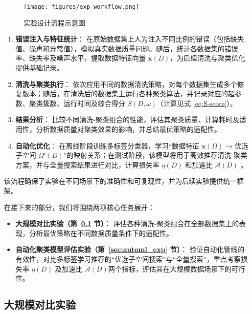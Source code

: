 \documentclass[10pt]{article} %
\numberwithin{equation}{section}
\begin{document}
\begin{figure}[htbp]
    \centering
    \texttt{[image: figures/exp\_workflow.png]}
    \caption{实验设计流程示意图}
    \label{fig:exp_workflow}
\end{figure}

\begin{enumerate}
    \item \textbf{错误注入与特征统计}：  
    在原始数据集上人为注入不同比例的错误（包括缺失值、噪声和异常值），模拟真实数据质量问题。随后，统计各数据集的错误率、缺失率及噪声水平，提取数据特征向量 \(\mathbf{x}(D)\)，为后续清洗与聚类优化提供基础记录。

    \item \textbf{清洗与聚类执行}：  
    依次应用不同的数据清洗策略，对每个数据集生成多个修复版本；随后，在清洗后的数据集上运行各种聚类算法，并记录对应的超参数、聚类簇数、运行时间及综合得分 \(S(D,\omega)\)（计算见式 \eqref{eq:S-score}）。

    \item \textbf{结果分析}：  
    比较不同清洗-聚类组合的性能，评估其聚类质量、计算耗时及适用性，分析数据质量对聚类效果的影响，并总结最优策略的适配性。

    \item \textbf{自动化优化}：  
    在离线阶段训练多标签分类器，学习“数据特征 \(\mathbf{x}(D)\) → 优选子空间 \(\Omega'(D)\)”的映射关系；在测试阶段，该模型将用于高效推荐清洗-聚类方案，并与全量搜索结果进行对比，计算损失率 \(\eta(D)\) 和加速比 \(\mathcal{A}(D)\) 。
\end{enumerate}

该流程确保了实验在不同场景下的准确性和可复现性，并为后续实验提供统一框架。

在接下来的部分，我们将围绕两项核心任务展开：
\begin{itemize}
    \item \textbf{大规模对比实验（第~\ref{sec:large_scale_exp} 节）}：  
    评估各种清洗-聚类组合在全部数据集上的表现，分析最优策略在不同数据质量条件下的适配性。

    \item \textbf{自动化聚类模型评估实验（第~\ref{sec:automl_exp} 节）}：  
    验证自动化管线的有效性，对比多标签学习推荐的“优选子空间搜索”与“全量搜索”，重点考察损失率 \(\eta(D)\) 及加速比 \(\mathcal{A}(D)\)两个指标，评估其在大规模数据场景下的可行性。
\end{itemize}

\subsection{大规模对比实验}
\label{sec:large_scale_exp}
\end{document}
